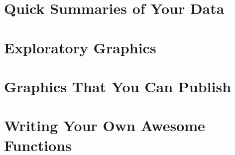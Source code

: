 \documentclass{book}
\begin{document}
\chapter{Quick Summaries of Your Data}
\label{ch_summaries}





\chapter{Exploratory Graphics}
\label{ch_expgraphics}



\chapter{Graphics That You Can Publish}
\label{ch_pubgraphics}


\chapter{Writing Your Own Awesome Functions}
\label{ch_functions}
\end{document}
